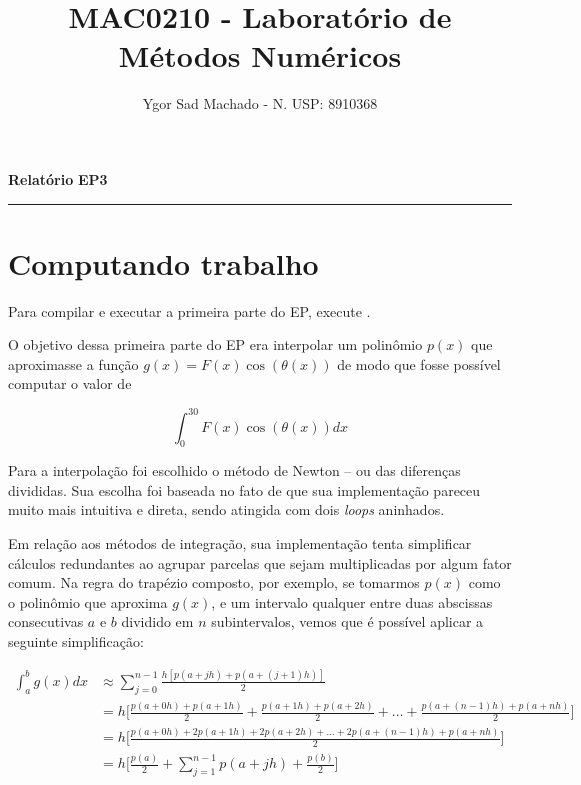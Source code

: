 \documentclass[11pt,reqno,a4paper]{amsart}
\newcommand{\code}[1]{\colorbox{light-gray}{\textcolor{dark-gray}{\fontsize{10}{10}{\texttt{#1}}}}}
\begin{document}
\graphicspath{{images/}}
\parindent=0pt

\title{MAC0210 - Laboratório de Métodos Numéricos}
\author{Ygor Sad Machado - N. USP: 8910368}

\pagestyle{plain}
\onehalfspace

\maketitle

\textbf{Relatório}\hfill
\textbf{EP3}\null
\medskip

\noindent\rule{\textwidth}{0.4pt}
\section{Computando trabalho}

\medskip
Para compilar e executar a primeira parte do EP, execute \code{make part\_1 \&\& ./part\_1.o}.

\bigskip
O objetivo dessa primeira parte do EP era interpolar um polinômio $p(x)$ que aproximasse a função $g(x) = F(x)\cos(\theta(x))$ de modo que fosse possível computar o valor de

\begin{equation}
    \int_{0}^{30} F(x)\cos(\theta(x)) dx
\end{equation}

\bigskip
Para a interpolação foi escolhido o método de Newton – ou das diferenças divididas. Sua escolha foi baseada no fato de que sua implementação pareceu muito mais intuitiva e direta, sendo atingida com dois \textit{loops} aninhados.

\bigskip
Em relação aos métodos de integração, sua implementação tenta simplificar cálculos redundantes ao agrupar parcelas que sejam multiplicadas por algum fator comum. Na regra do trapézio composto, por exemplo, se tomarmos $p(x)$ como o polinômio que aproxima $g(x)$, e um intervalo qualquer entre duas abscissas consecutivas $a$ e $b$ dividido em $n$ subintervalos, vemos que é possível aplicar a seguinte simplificação:

{\footnotesize
\begin{align*}
    \int_a^b g(x) dx &\approx \sum_{j=0}^{n-1} \frac{h [p(a + jh) + p(a + (j + 1)h)]}{2}\\
                     &= h \Big[\frac{p(a + 0h) + p(a + 1h)}{2} + \frac{p(a + 1h) + p(a + 2h)}{2} + \ldots + \frac{p(a + (n-1)h) + p(a + nh)}{2}\Big]\\
                     &= h \Big[\frac{p(a + 0h) + 2p(a + 1h) + 2p(a + 2h) + \ldots + 2p(a + (n-1)h) + p(a + nh)}{2}\Big]\\
                     &= h \Big[\frac{p(a)}{2} + \sum_{j=1}^{n-1} p(a + jh) + \frac{p(b)}{2}\Big]
\end{align*}
}%
\end{document}
